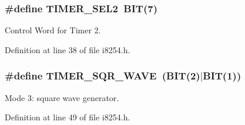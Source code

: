 \subsubsection[{T\+I\+M\+E\+R\+\_\+\+S\+E\+L2}]{\setlength{\rightskip}{0pt plus 5cm}\#define T\+I\+M\+E\+R\+\_\+\+S\+E\+L2~{\bf B\+I\+T}(7)}\label{group__i8254_ga142a255de0dbc48aeabd45fc10c33672}


Control Word for Timer 2. 



Definition at line 38 of file i8254.\+h.

\hypertarget{group__i8254_ga4745cbf21da3d3fea5dbb080b2b73bac}{}
\subsubsection[{T\+I\+M\+E\+R\+\_\+\+S\+Q\+R\+\_\+\+W\+A\+V\+E}]{\setlength{\rightskip}{0pt plus 5cm}\#define T\+I\+M\+E\+R\+\_\+\+S\+Q\+R\+\_\+\+W\+A\+V\+E~({\bf B\+I\+T}(2)$\vert${\bf B\+I\+T}(1))}\label{group__i8254_ga4745cbf21da3d3fea5dbb080b2b73bac}


Mode 3\+: square wave generator. 



Definition at line 49 of file i8254.\+h.

